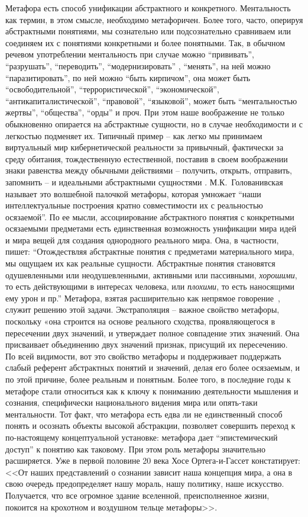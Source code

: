 Метафора есть способ унификации абстрактного и конкретного. Ментальность как термин,
в этом смысле, необходимо метафоричен. Более того, часто, оперируя абстрактными понятиями,
мы сознательно или подсознательно сравниваем или соединяем их с понятиями конкретными и
более понятными. Так, в обычном речевом употреблении ментальность при случае можно ``прививать'',
``разрушать'', ``переводить'', ``модернизировать'' , ``менять'', на ней можно ``паразитировать'',
по ней можно ``быть кирпичом'', она может быть ``освободительной'',
``террористической'', ``экономической'', ``антикапиталистической'', ``правовой'', ``языковой'',
может быть ``ментальностью жертвы'', ``общества'', ``орды'' и проч. При этом наше
воображение не только обыкновенно опирается на абстрактные сущности, но в случае необходимости
и с легкостью подменяет их. Типичный пример -- как легко мы принимаем виртуальный
мир кибернетической реальности за привычный, фактически за среду обитания,
тождественную естественной, поставив в своем воображении знаки равенства между обычными действиями --
получить, открыть, отправить, запомнить -- и идеальными абстрактными сущностями
\autocite{ivanov_virtual}. М.К.~Голованивская называет это волшебной палочкой метафоры,
которая умножает ``наши интеллектуальные построения кратно совместимости их с реальностью осязаемой''.
По ее мысли, ассоциирование абстрактного понятия с конкретными осязаемыми предметами есть
единственная возможность унификации мира идей и мира вещей для создания однородного
реального мира. Она, в частности, пишет: ``Отождествляя абстрактные понятия с предметами материального мира,
мы ощущаем их как реальные сущности. Абстрактные понятия становятся одушевленными или неодушевленными,
активными или пассивными, \emph{хорошими}, то есть действующими в интересах человека, или
\emph{плохими}, то есть наносящими ему урон и пр.'' Метафора, взятая расширительно как непрямое
говорение~\autocite{lingvo_dictionary}, служит решению этой задачи. Экстраполяция --
важное свойство метафоры, поскольку «она строится на основе реального сходства,
проявляющегося в пересечении двух значений, и утверждает полное совпадение этих значений.
Она присваивает объединению двух значений признак, присущий их пересечению.~\autocite[][194--197]{razlogova}
По всей видимости, вот это свойство метафоры и поддерживает поддержать слабый референт
абстрактных понятий и значений, делая его более осязаемым, и по этой причине, более
реальным и понятным. Более того, в последние годы к метафоре стали относиться как к ключу
к пониманию деятельности мышления и сознания, специфически национального видения мира или опять-таки
ментальности. Тот факт, что метафора есть едва ли не единственный способ понять и осознать
объекты высокой абстракции, позволяет совершить переход к по-настоящему концептуальной установке:
метафора дает ``эпистемический доступ'' к понятию как таковому\autocite{boyd}.
При этом роль метафоры значительно расширяется. Уже в первой половине 20 века
Хосе Ортега-и-Гассет констатирует: <<От наших представлений о сознании зависит наша
концепция мира, а она в свою очередь предопределяет нашу мораль, нашу политику,
наше искусство. Получается, что все огромное здание вселенной, преисполненное жизни,
покоится на крохотном и воздушном тельце метафоры>>\autocite{metaphors}.

